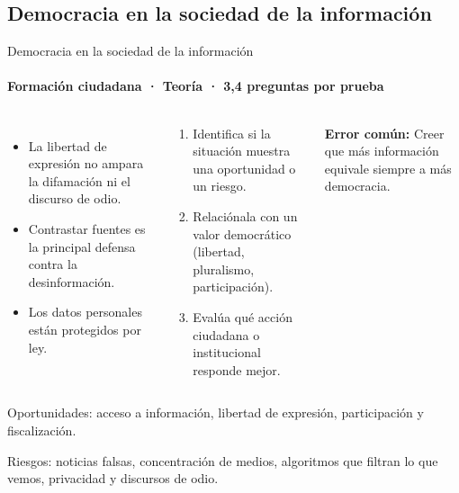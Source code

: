 \documentclass[aspectratio=169,11pt]{beamer}
\newlength{\ajustealto}
\newenvironment{ajustar}[1][0.74\textheight]
  {\setlength{\ajustealto}{#1}\begin{lrbox}{\ajustecaja}\begin{minipage}{\textwidth}}
  {\end{minipage}\end{lrbox}%
   \ifdim\dimexpr\ht\ajustecaja+\dp\ajustecaja\relax>\ajustealto
     \resizebox*{!}{\ajustealto}{\usebox{\ajustecaja}}\else\usebox{\ajustecaja}\fi}
\begin{document}
\subsection{Democracia en la sociedad de la información}

\begin{frame}{Democracia en la sociedad de la información}
\label{tema-hi-informacion}
\framesubtitle{Formación ciudadana · Teoría · 3,4 preguntas por prueba}
\begin{ajustar}
\begin{columns}[T,onlytextwidth]
\begin{itemize}\footnotesize
\item La libertad de expresión no ampara la difamación ni el discurso de odio.
\item Contrastar fuentes es la principal defensa contra la desinformación.
\item Los datos personales están protegidos por ley.
\end{itemize}
\begin{cajaregla}\scriptsize \begin{enumerate}\item Identifica si la situación muestra una oportunidad o un riesgo.\item Relaciónala con un valor democrático (libertad, pluralismo, participación).\item Evalúa qué acción ciudadana o institucional responde mejor.\end{enumerate}\end{cajaregla}
\begin{notagris}\scriptsize \textbf{Error común:} Creer que más información equivale siempre a más democracia.\end{notagris}
\end{columns}
\begin{cajaclave}\footnotesize
Oportunidades: acceso a información, libertad de expresión, participación y fiscalización.

Riesgos: noticias falsas, concentración de medios, algoritmos que filtran lo que vemos, privacidad y discursos de odio.
\end{cajaclave}
\end{ajustar}
\end{frame}
\end{document}
